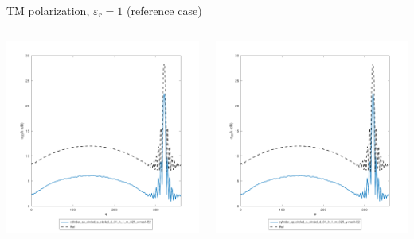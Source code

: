 \begin{frame}{TM polarization, $\varepsilon_r=1$ (reference case)}


\begin{columns}

\includegraphics[width=\linewidth]{results/FF/cylD_01_H_1_M_025_X/iiee.png}


\includegraphics[width=\linewidth]{results/FF/cylD_01_H_1_M_025_Y/iiee.png}


\end{columns}
\end{frame}
